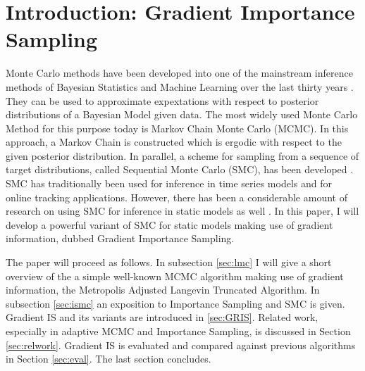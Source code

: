 \section{Introduction: Gradient Importance Sampling}

Monte Carlo methods have been developed into one of the mainstream inference methods of Bayesian Statistics and Machine Learning over the last thirty years \cite{Robert2004}. They can be used to approximate expextations with respect to posterior distributions of a Bayesian Model given data. The most widely used Monte Carlo Method for this purpose today is Markov Chain Monte Carlo (MCMC). In this approach, a Markov Chain is constructed which is ergodic with respect to the given posterior distribution.
In parallel, a scheme for sampling from a sequence of target distributions, called Sequential Monte Carlo (SMC), has been developed \cite{Doucet2001a}. SMC has traditionally been used for inference in time series models and for online tracking applications. However, there has been a considerable amount of research on using SMC for inference in static models as well \cite{Chopin2002,DelMoral2006,Schafer2013}. In this paper, I will develop a powerful variant of SMC for static models making use of gradient information, dubbed Gradient Importance Sampling.

The paper will proceed as follows. In subsection \ref{sec:lmc} I will give a short overview of the a simple well-known MCMC algorithm making use of gradient information, the Metropolis Adjusted Langevin Truncated Algorithm. In subsection \ref{sec:ismc} an exposition to Importance Sampling and SMC is given. Gradient IS and its variants  are introduced in \ref{sec:GRIS}. Related work, especially in adaptive MCMC and Importance Sampling, is discussed in Section \ref{sec:relwork}. Gradient IS is evaluated and compared against previous algorithms in Section \ref{sec:eval}. The last section concludes.




